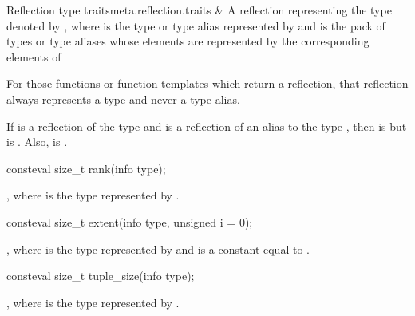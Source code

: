 \begin{libreqtab2b}{Reflection type traits}{meta.reflection.traits}
  &
A reflection representing the type denoted by
,
where  is the type or type alias represented by 
and  is the pack of types or type aliases
whose elements are represented by the corresponding elements of 
\\
\end{libreqtab2b}

\pnum
\begin{note}
For those functions or function templates which return a reflection,
that reflection always represents a type and never a type alias.
\end{note}

\pnum
\begin{note}
If  is a reflection of the type 
and  is a reflection of an alias to the type ,
then  is 
but  is .
Also,  is .
\end{note}

%
\begin{itemdecl}
consteval size_t rank(info type);
\end{itemdecl}

\begin{itemdescr}
\pnum
\returns
{},
where  is the type represented by .
\end{itemdescr}

%
\begin{itemdecl}
consteval size_t extent(info type, unsigned i = 0);
\end{itemdecl}

\begin{itemdescr}
\pnum
\returns
{},
where  is the type represented by 
and  is a constant equal to .
\end{itemdescr}

%
\begin{itemdecl}
consteval size_t tuple_size(info type);
\end{itemdecl}

\begin{itemdescr}
\pnum
\returns
{},
where  is the type represented by .
\end{itemdescr}

